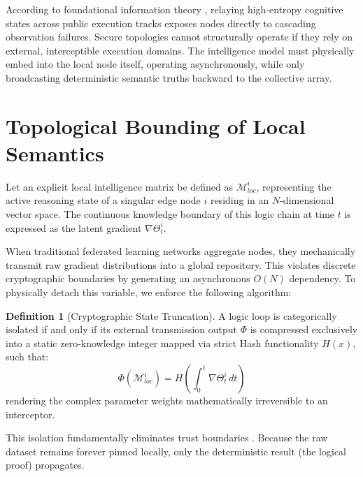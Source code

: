 \documentclass[12pt, a4paper]{article}
\theoremstyle{plain}
\theoremstyle{definition}
\newtheorem{definition}[theorem]{Definition}
\begin{document}
According to foundational information theory \cite{shannon1948mathematical}, relaying high-entropy cognitive states across public execution tracks exposes nodes directly to cascading observation failures. Secure topologies cannot structurally operate if they rely on external, interceptible execution domains. The intelligence model must physically embed into the local node itself, operating asynchronously, while only broadcasting deterministic semantic truths backward to the collective array.

\section{Topological Bounding of Local Semantics}
Let an explicit local intelligence matrix be defined as $\mathcal{M}_{loc}^{i}$, representing the active reasoning state of a singular edge node $i$ residing in an $N$-dimensional vector space. The continuous knowledge boundary of this logic chain at time $t$ is expressed as the latent gradient $\nabla \Theta_t^i$.

When traditional federated learning networks aggregate nodes, they mechanically transmit raw gradient distributions into a global repository. This violates discrete cryptographic boundaries by generating an asynchronous $O(N)$ dependency.
To physically detach this variable, we enforce the following algorithm:

\begin{definition}[Cryptographic State Truncation]
A logic loop is categorically isolated if and only if its external transmission output $\Phi$ is compressed exclusively into a static zero-knowledge integer mapped via strict Hash functionality $H(x)$, such that:
\begin{equation}
    \Phi\left(\mathcal{M}_{loc}^i\right) = H\left(\int_{0}^{t} \nabla \Theta_t^i \, dt\right)
\end{equation}
rendering the complex parameter weights mathematically irreversible to an interceptor.
\end{definition}

This isolation fundamentally eliminates trust boundaries \cite{lamport1978time}. Because the raw dataset remains forever pinned locally, only the deterministic result (the logical proof) propagates. 

\end{document}
